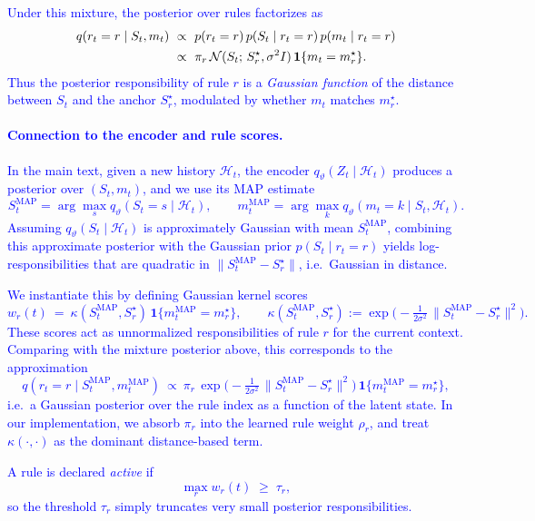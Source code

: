 \documentclass{article} %
\newcommand{\revise}[1]{\textcolor{blue}{#1}}
\begin{document}
\revise{Under this mixture, the posterior over rules factorizes as
\begin{align}
q(r_t = r \mid S_t, m_t)
&~\propto~
p(r_t = r)\,p(S_t \mid r_t = r)\,p(m_t \mid r_t = r) \\
&~\propto~
\pi_r\,\mathcal N(S_t;\,S_r^\star,\sigma^2 I)\,\mathbf{1}\{m_t = m_r^\star\}. \notag
\end{align}
Thus the posterior responsibility of rule $r$ is a \emph{Gaussian function} of the distance between $S_t$ and the anchor $S_r^\star$, modulated by whether $m_t$ matches $m_r^\star$.}
\revise{\paragraph{Connection to the encoder and rule scores.}
In the main text, given a new history $\mathcal H_t$, the encoder $q_\vartheta(Z_t \mid \mathcal H_t)$ produces a posterior over $(S_t,m_t)$, and we use its MAP estimate
\[
S_t^{\text{MAP}} = \arg\max_s q_\vartheta(S_t=s\mid \mathcal H_t),\qquad
m_t^{\text{MAP}} = \arg\max_k q_\vartheta(m_t=k\mid S_t,\mathcal H_t).
\]
Assuming $q_\vartheta(S_t \mid \mathcal H_t)$ is approximately Gaussian with mean $S_t^{\text{MAP}}$, combining this approximate posterior with the Gaussian prior $p(S_t \mid r_t=r)$ yields log-responsibilities that are quadratic in $\|S_t^{\text{MAP}} - S_r^\star\|$, i.e.\ Gaussian in distance.}

\revise{We instantiate this by defining Gaussian kernel scores
\[
w_r(t)
~=~ \kappa(S_t^{\text{MAP}}, S_r^\star)\,\mathbf{1}\{m_t^{\text{MAP}} = m_r^\star\},
\qquad
\kappa(S_t^{\text{MAP}}, S_r^\star)
:= \exp\!\Big(-\tfrac{1}{2\sigma^2}\,\|S_t^{\text{MAP}} - S_r^\star\|^2\Big).
\]
These scores act as unnormalized responsibilities of rule $r$ for the current context. Comparing with the mixture posterior above, this corresponds to the approximation
\[
q(r_t = r \mid S_t^{\text{MAP}}, m_t^{\text{MAP}})
~\propto~
\pi_r\,\exp\!\Big(-\tfrac{1}{2\sigma^2}\,\|S_t^{\text{MAP}} - S_r^\star\|^2\Big)\,\mathbf{1}\{m_t^{\text{MAP}} = m_r^\star\},
\]
i.e.\ a Gaussian posterior over the rule index as a function of the latent state. In our implementation, we absorb $\pi_r$ into the learned rule weight $\rho_r$, and treat $\kappa(\cdot,\cdot)$ as the dominant distance-based term.}

\revise{A rule is declared \emph{active} if
\[
\max_r w_r(t) \;\ge\; \tau_r,
\]
so the threshold $\tau_r$ simply truncates very small posterior responsibilities.}
\end{document}
